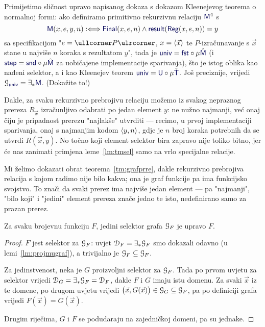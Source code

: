 Primijetimo sličnost upravo napisanog dokaza s dokazom Kleenejevog teorema o normalnoj formi: ako definiramo primitivno rekurzivnu relaciju $\f M^4$ s
\begin{equation}
    \f M(x,e,y,n):\Longleftrightarrow\f{Final}(x,e,n)\land\f{result}(\f{Reg}(x,e,n))=y
\end{equation}
sa specifikacijom "$e=\kprog P$, $x=\langle\vec x\rangle$ te $P$-izračunavanje s $\vec x$ stane u najviše $n$ koraka s rezultatom $y$", tada je $\f{univ}=\f{fst}\circ\mu\hat{\f M}$ (i $\f{step}=\f{snd}\circ\mu\hat{\f M}$ za uobičajene implementacije sparivanja), što je istog oblika kao nađeni selektor, a i kao Kleenejev teorem $\f{univ}=\f U\circ\mu\check{\f T}$. Još preciznije, vrijedi $\graf{\f{univ}}=\exists_*\f M$. (Dokažite to!)


Dakle, za svaku rekurzivno prebrojivu relaciju možemo iz svakog nepraznog prereza $R_{\vec x}$ izračunljivo odabrati po jedan element $y$: ne nužno najmanji, već onaj čiju je pripadnost prerezu "najlakše" utvrditi --- recimo, u prvoj implementaciji sparivanja, onaj s najmanjim kodom $\langle y,n\rangle$, gdje je $n$ broj koraka potrebnih da se utvrdi $R(\vec x,y)$.
%
No točno koji element selektor bira zapravo nije toliko bitno, jer će nas zanimati primjena leme~\ref{lm:tmsel} samo na vrlo specijalne relacije.

Mi želimo dokazati obrat teorema~\ref{tm:grafprre}, dakle rekurzivno prebrojiva relacija s kojom radimo nije bilo kakva; ona je graf funkcije pa ima funkcijsko svojstvo. To znači da svaki prerez ima najviše jedan element --- pa "najmanji", "bilo koji" i "jedini" element prereza znače jedno te isto, nedefinirano samo za prazan prerez.

\begin{lema}[{name=[jedinstvenost selektora grafa funkcije]}]\label{lm:selgraf}
Za svaku brojevnu funkciju $F$, jedini selektor grafa $\mathcal G_{F}$ je upravo $F$.
\end{lema}
\begin{proof}
$F$ jest selektor za $\mathcal G_{F}$: uvjet $\mathcal D_{F}=\exists_*\mathcal G_{F}$ smo dokazali odavno (u lemi~\ref{lm:projmugraf}), a trivijalno je $\mathcal G_{F}\subseteq\mathcal G_{F}$.

Za jedinstvenost, neka je $G$ proizvoljni selektor za $\mathcal G_{F}$. Tada po prvom uvjetu za selektor vrijedi $\mathcal D_{G}=\exists_*\mathcal G_{F}=\mathcal D_{F}$, dakle $F$ i $G$ imaju istu domenu. Za svaki $\vec x$ iz te domene, po drugom uvjetu vrijedi $\bigl(\vec x,G(\vec x)\bigr)\in\mathcal G_{G}\subseteq\mathcal G_{F}$, pa po definiciji grafa vrijedi $F(\vec x)=G(\vec x)$.

Drugim riječima, $G$ i $F$ se podudaraju na zajedničkoj domeni, pa su jednake.
\end{proof}

